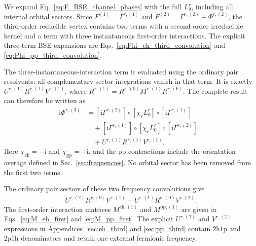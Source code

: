 \documentclass[aip,jcp,reprint,noshowkeys,superscriptaddress]{revtex4-1}
\newcommand{\ii}{\mathrm{i}}
\newcommand{\hhp}{\text{2h1p}}
\newcommand{\pph}{\text{2p1h}}
\newcommand{\eh}{\text{eh}}
\newcommand{\pp}{\text{pp}}
\begin{document}
We expand Eq.~\eqref{eq:F_BSE_channel_phases} with the full $L_0^r$,
including all internal orbital sectors. Since
$F^{(1)}=\Gamma^{r,(1)}$ and
$F^{(2)}=\Gamma^{r,(2)}+\Phi^{r,(2)}$, the third-order reducible vertex
contains two terms with a second-order irreducible kernel and a term with
three instantaneous first-order interactions. The explicit three-term BSE
expansions are Eqs.~\eqref{eq:Phi_eh_third_convolution} and
\eqref{eq:Phi_pp_third_convolution}.

The three-instantaneous-interaction term is evaluated using the ordinary
pair resolvents: all complementary-sector integrations vanish in that term.
It is exactly $U^{r,(1)}R^{r,(1)}V^{r,(1)}$, where
$R^{r,(1)}=R^{r,(0)}M^{r,(1)}R^{r,(0)}$.
The complete result can therefore be written as
\begin{equation}
\begin{split}
\ii\Phi^{r,(3)}
&=[\ii\Gamma^{r,(2)}]\circ[\chi_r L_0^r]
\circ[\ii\Gamma^{r,(1)}]
\\
&\quad+[\ii\Gamma^{r,(1)}]\circ[\chi_r L_0^r]
\circ[\ii\Gamma^{r,(2)}]
\\
&\quad+U^{r,(1)}R^{r,(1)}V^{r,(1)}.
\end{split}
\label{eq:complete_third_main}
\end{equation}
Here $\chi_\eh=-\ii$ and $\chi_\pp=+\ii$, and the $\pp$ contractions
include the orientation average defined in Sec.~\ref{sec:frequencies}.
No orbital sector has been removed from the first two terms.

The ordinary pair sectors of these two frequency convolutions give
\begin{equation}
\begin{split}
&U^{r,(2)}R^{r,(0)}V^{r,(1)}
+U^{r,(1)}R^{r,(0)}V^{r,(2)}.
\end{split}
\label{eq:ordinary_third_couplings}
\end{equation}
The first-order interaction matrices $M^{\eh,(1)}$ and $M^{\pp,(1)}$
are given in Eqs.~\eqref{eq:M_eh_first} and \eqref{eq:M_pp_first}.
The explicit $U^{r,(2)}$ and $V^{r,(2)}$ expressions in
Appendices~\ref{sec:eh_third} and \ref{sec:pp_third} contain
$\hhp$ and $\pph$ denominators and retain one external fermionic frequency.
\end{document}
